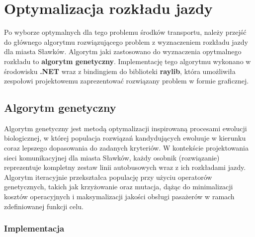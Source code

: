 \chapter{Optymalizacja rozkładu jazdy}
Po wyborze optymalnych dla tego problemu środków transportu, należy przejść do głównego algorytmu rozwiązującego problem z wyznaczeniem rozkładu jazdy dla miasta Sławków. Algorytm jaki zastosowano do wyznaczenia opytmalnego rozkładu to \textbf{algorytm genetyczny}. Implementację tego algorytmu wykonano w środowisku \textbf{.NET} wraz z bindingiem do biblioteki \textbf{raylib}, która umożliwiła
zespołowi projektowemu zaprezentować rozwiązany problem w formie graficznej.  

\section{Algorytm genetyczny}
Algorytm genetyczny jest metodą optymalizacji inspirowaną procesami ewolucji biologicznej, w której populacja rozwiązań kandydujących ewoluuje w kierunku coraz lepszego dopasowania do zadanych kryteriów. W kontekście projektowania sieci komunikacyjnej dla miasta Sławków, każdy osobnik (rozwiązanie) reprezentuje kompletny zestaw linii autobusowych wraz z ich rozkładami jazdy. Algorytm iteracyjnie przekształca populację przy użyciu operatorów genetycznych, takich jak krzyżowanie oraz mutacja, dążąc do minimalizacji kosztów operacyjnych i maksymalizacji jakości obsługi pasażerów w ramach zdefiniowanej funkcji celu.
\subsection{Implementacja}

